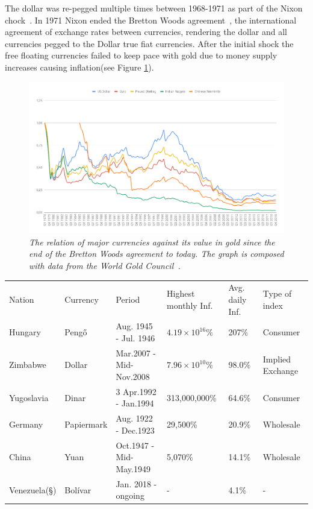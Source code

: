 The dollar was re-pegged multiple times between 1968-1971 as part of the Nixon chock~\cite{bordo:bretton:woods}. In 1971 Nixon ended the Bretton Woods agreement~\cite{bordo:bretton:woods}, the international agreement of exchange rates between currencies, rendering the dollar and all currencies pegged to the Dollar true fiat currencies. After the initial shock the free floating currencies failed to keep pace with gold due to money supply increases causing inflation(see Figure \ref{fig:gold:price:major:currency}).

\begin{figure}[!htb]
	\centering
	\includegraphics[width=16cm]{external/gold-price.png}
	\caption{\textit{The relation of major currencies against its value in gold since the end of the Bretton Woods agreement to
			today. The graph is composed with data from the World Gold Council~\cite{world:gold:council}. 
	}}
	\label{fig:gold:price:major:currency}
\end{figure}

\twocolumn

\begin{table}[t]
	\hspace{-0.85cm}
	\begin{tabular}{llllll}
		Nation & Currency & Period & Highest monthly Inf. & Avg. daily Inf. & Type of index\\
		Hungary & Pengő & Aug. 1945 - Jul. 1946 & $ 4.19 × 10^{16}\% $ & 207\% & Consumer \\
		Zimbabwe & Dollar & Mar.2007 - Mid-Nov.2008 & $7.96 × 10^{10}\%$ & 98.0\% & Implied Exchange \\
		Yugoslavia & Dinar & 3 Apr.1992 - Jan.1994 & 313,000,000\% & 64.6\% & Consumer \\
		Germany & Papiermark & Aug. 1922 - Dec.1923 & 29,500\% & 20.9\% & Wholesale \\
		China & Yuan & Oct.1947 - Mid-May.1949 & 5,070\% & 14.1\% &	Wholesale \\
		Venezuela(§) & Bolívar & Jan. 2018 - ongoing & - & 4.1\% & - \\ 

	\end{tabular}
	\label{tab:inflation}

\end{table}

